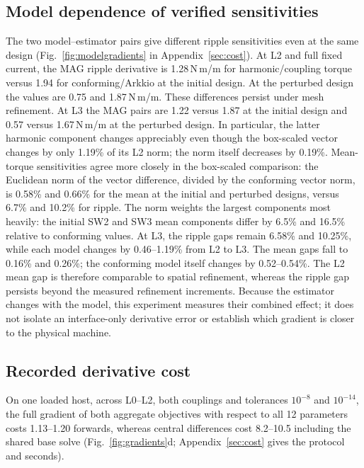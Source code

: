 \documentclass{anvil-paper}
\begin{document}
\subsection{Model dependence of verified sensitivities}
The two model--estimator pairs give different ripple sensitivities even
at the same design (Fig.~\ref{fig:modelgradients} in Appendix~\ref{sec:cost}). At L2 and full fixed
current, the MAG ripple derivative is 1.28\,N\,m/m for harmonic/coupling
torque versus 1.94 for conforming/Arkkio at the initial design. At the
perturbed design the values are 0.75 and 1.87\,N\,m/m. These differences
persist under mesh refinement. At L3 the MAG pairs are 1.22 versus 1.87
at the initial design and 0.57 versus 1.67\,N\,m/m at the perturbed design.
In particular, the latter harmonic component changes appreciably even
though the box-scaled vector changes by only 1.19\% of its L2 norm;
the norm itself decreases by 0.19\%. Mean-torque
sensitivities agree more closely in the box-scaled comparison: the
Euclidean norm of the vector difference, divided by the conforming vector
norm, is 0.58\% and 0.66\% for the mean at the initial and perturbed
designs, versus 6.7\% and 10.2\% for ripple. The norm weights the largest
components most heavily: the initial SW2 and SW3 mean components differ
by 6.5\% and 16.5\% relative to conforming values.
At L3, the ripple gaps remain 6.58\% and 10.25\%, while each model
changes by 0.46--1.19\% from L2 to L3. The mean gaps fall to 0.16\%
and 0.26\%; the conforming model itself changes by 0.52--0.54\%.
The L2 mean gap is therefore comparable to spatial refinement, whereas
the ripple gap persists beyond the measured refinement increments. Because the
estimator changes with the model, this experiment measures their combined
effect; it does not isolate an interface-only derivative error or establish
which gradient is closer to the physical machine.

\subsection{Recorded derivative cost}
On one loaded host, across L0--L2, both couplings and tolerances $10^{-8}$
and $10^{-14}$, the full gradient of both aggregate objectives with respect
to all 12 parameters costs 1.13--1.20 forwards, whereas central differences
cost 8.2--10.5 including the shared base solve (Fig.~\ref{fig:gradients}d;
Appendix~\ref{sec:cost} gives the protocol and seconds).
\end{document}
